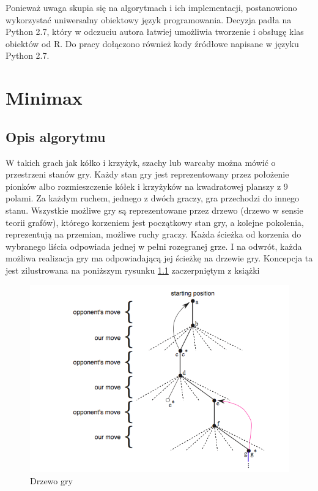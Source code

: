 \documentclass[licencjacka]{pracamgr}
\begin{document}
Ponieważ uwaga skupia się na  algorytmach i ich implementacji, postanowiono wykorzystać uniwersalny obiektowy język programowania. Decyzja padła na Python 2.7, który w odczuciu autora łatwiej umożliwia tworzenie i obsługę klas obiektów od R.  Do pracy dołączono również kody źródłowe napisane w języku Python 2.7.


\chapter{Minimax}\label{r:Minimax}


\section{Opis algorytmu}

W takich grach jak kółko i krzyżyk, szachy lub warcaby można mówić o przestrzeni stanów gry. Każdy stan  gry jest reprezentowany przez położenie pionków albo rozmieszczenie kółek i krzyżyków na kwadratowej planszy z 9 polami. Za każdym ruchem, jednego z dwóch graczy, gra przechodzi do innego stanu. Wszystkie możliwe gry są reprezentowane przez drzewo (drzewo w sensie teorii grafów), którego korzeniem jest początkowy stan gry, a kolejne pokolenia, reprezentują na przemian, możliwe ruchy graczy.  Każda ścieżka od korzenia do wybranego liścia  odpowiada jednej w pełni rozegranej grze. I na odwrót, każda możliwa realizacja gry ma odpowiadającą jej ścieżkę na drzewie gry.  Koncepcja ta  jest zilustrowana na poniższym rysunku \ref{Rys1} zaczerpniętym z książki \cite{RL} \\
\begin{center}
	\begin{figure}[h!]
	\includegraphics [scale=0.60] {game_tree.png}
	\caption{Drzewo gry}
	\label{Rys1}
	\end{figure}
\end{center}
\end{document}

